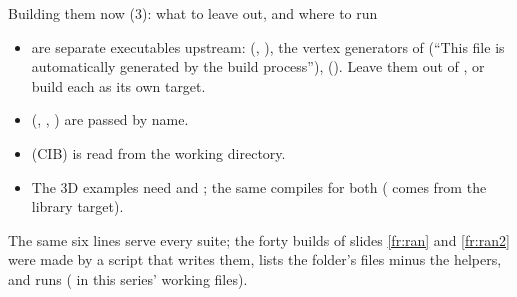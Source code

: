 \documentclass[aspectratio=169,11pt]{beamer}
\begin{document}
\begin{frame}{Building them now (3): what to leave out, and where to run}
\label{fr:cmake3}
\footnotesize
\begin{itemize}
  \item {} are separate executables upstream:  (, ), the  vertex generators of  (``This file is automatically generated by the build process''),  (). Leave them out of , or build each as its own target.
  \item {} (, , ) are passed by name.
  \item {} (CIB) is read from the working directory.
  \item The 3D examples need  and ; the same  compiles for both ( comes from the library target).
\end{itemize}
\vspace{1mm}

\footnotesize The same six lines serve every suite; the forty builds of slides \ref{fr:ran} and \ref{fr:ran2} were made by a script that writes them, lists the folder's  files minus the helpers, and runs  ( in this series' working files).
\end{frame}
\end{document}
